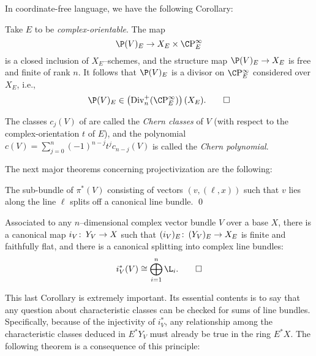 In coordinate-free language, we have the following Corollary:
\begin{corollary}
Take $E$ to be \emph{complex-orientable}.  The map \[\P(V)_E \to X_E \times \CP^\infty_E\] is a closed inclusion of $X_E$--schemes, and the structure map $\P(V)_E \to X_E$ is free and finite of rank $n$.  It follows that $\P(V)_E$ is a divisor on $\CP^\infty_E$ considered over $X_E$, i.e., \[\P(V)_E \in \left(\Div_n^+(\CP^\infty_E)\right)(X_E). \qed\]
\end{corollary}

\begin{definition}
The classes $c_j(V)$ of  are called the \textit{Chern classes} of $V$ (with respect to the complex-orientation $t$ of $E$), and the polynomial $c(V) = \sum_{j=0}^n (-1)^{n-j} t^j c_{n-j}(V)$ is called the \textit{Chern polynomial}.
\end{definition}

The next major theorems concerning projectivization are the following:

\begin{corollary}
The sub-bundle of $\pi^*(V)$ consisting of vectors $(v, (\ell, x))$ such that $v$ lies along the line $\ell$ splits off a canonical line bundle. \qed
\end{corollary}

\begin{corollary}\label{OriginalSplittingPrinciple}
Associated to any $n$--dimensional complex vector bundle $V$ over a base $X$, there is a canonical map $i_V\colon\thinspace Y_V \to X$ such that $(i_V)_E\colon\thinspace (Y_V)_E \to X_E$ is finite and faithfully flat, and there is a canonical splitting into complex line bundles: \[i_V^*(V) \cong \bigoplus_{i=1}^n \L_i. \qed\]
\end{corollary}

This last Corollary is extremely important.  Its essential contents is to say that any question about characteristic classes can be checked for sums of line bundles.  Specifically, because of the injectivity of $i_V^*$, any relationship among the characteristic classes deduced in $E^* Y_V$ must already be true in the ring $E^* X$.  The following theorem is a consequence of this principle:

